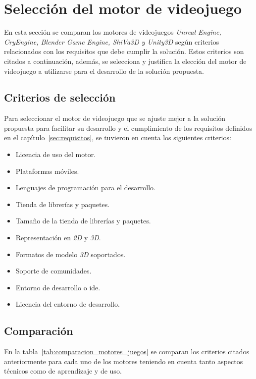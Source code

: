 \section{Selección del motor de videojuego}
\label{sec:seleccion_plataforma}

En esta sección se comparan los motores de videojuegos \textit{Unreal Engine,
    CryEngine, Blender Game Engine, ShiVa3D y Unity3D} según criterios relacionados 
con los requisitos que debe cumplir la solución. Estos criterios son citados a continuación, 
además, se selecciona y justifica la elección del motor de videojuego a utilizarse para 
el desarrollo de la solución propuesta.

\subsection{Criterios de selección}

Para seleccionar el motor de videojuego que se ajuste mejor
a la solución propuesta para facilitar su desarrollo y el cumplimiento de los
requisitos definidos en el capítulo~\ref{sec:requisitos}, se tuvieron en cuenta los
siguientes criterios:

\begin{itemize}
\item Licencia de uso del motor.
\item Plataformas móviles.
\item Lenguajes de programación para el desarrollo.
\item Tienda de librerías y paquetes.
\item Tamaño de la tienda de librerías y paquetes.
\item Representación en \textit{2D} y \textit{3D}.
\item Formatos de modelo \textit{3D} soportados.
\item Soporte de comunidades.
\item Entorno de desarrollo o \Gls{ide}.
\item Licencia del entorno de desarrollo.
\end{itemize}


\subsection{Comparación}

En la tabla~\ref{tab:comparacion_motores_juegos} se comparan los criterios citados 
anteriormente para cada uno de los motores teniendo en cuenta tanto aspectos técnicos 
como de aprendizaje y de uso.

